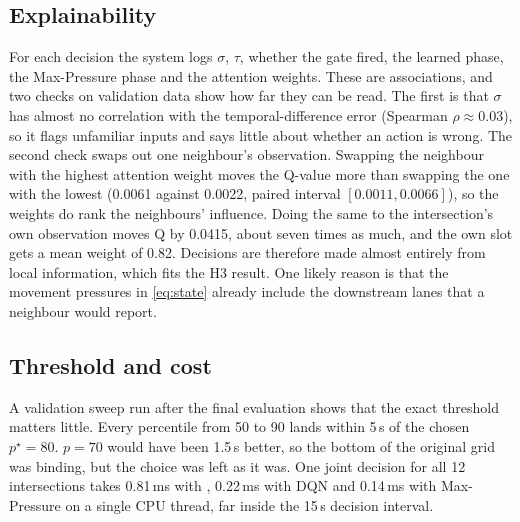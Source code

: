 \subsection{Explainability}
For each decision the system logs $\sigma$, $\tau$, whether the gate fired, the learned
phase, the Max-Pressure phase and the attention weights. These are associations, and two
checks on validation data show how far they can be read. The first is that $\sigma$ has almost
no correlation with the temporal-difference error (Spearman $\rho\approx0.03$), so it flags
unfamiliar inputs and says little about whether an action is wrong. The second check swaps
out one neighbour's observation. Swapping the neighbour with the highest attention weight
moves the Q-value more than swapping the one with the lowest (0.0061 against 0.0022, paired
interval $[0.0011, 0.0066]$), so the weights do rank the neighbours' influence. Doing the same
to the intersection's own observation moves Q by 0.0415, about seven times as much, and the own
slot gets a mean weight of 0.82. Decisions are therefore made almost entirely from local
information, which fits the H3 result. One likely reason is that the movement pressures in
\cref{eq:state} already include the downstream lanes that a neighbour would report.

\subsection{Threshold and cost}
A validation sweep run after the final evaluation shows that the exact threshold matters
little. Every percentile from 50 to 90 lands within 5\,s of the chosen $p^\star=80$. $p=70$
would have been 1.5\,s better, so the bottom of the original grid was binding, but the choice
was left as it was. One joint decision for all 12 intersections takes 0.81\,ms with \ugmarl{},
0.22\,ms with DQN and 0.14\,ms with Max-Pressure on a single CPU thread, far inside the 15\,s
decision interval.

